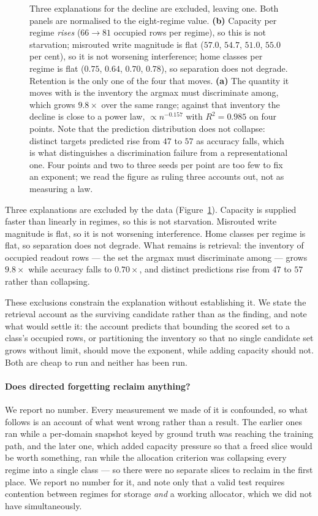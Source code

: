\documentclass[11pt,a4paper]{article}
\begin{document}
\begin{figure}[h]
\begin{subfigure}[t]{0.48\textwidth}
\end{subfigure}
\caption{Three explanations for the decline are excluded, leaving one. Both
panels are normalised to the eight-regime value. \textbf{(b)} Capacity per
regime \emph{rises} ($66\to81$ occupied rows per regime), so this is not
starvation; misrouted write magnitude is flat ($57.0$, $54.7$, $51.0$, $55.0$
per cent), so it is not worsening interference; home classes per regime is flat
($0.75$, $0.64$, $0.70$, $0.78$), so separation does not degrade. Retention is
the only one of the four that moves. \textbf{(a)} The quantity it moves with is
the inventory the argmax must discriminate among, which grows $9.8\times$ over
the same range; against that inventory the decline is close to a power law,
$\propto n^{-0.157}$ with $R^2=0.985$ on four points. Note that the prediction
distribution does not collapse: distinct targets predicted rise from $47$ to
$57$ as accuracy falls, which is what distinguishes a discrimination failure
from a representational one. Four points and two to three seeds per point are
too few to fix an exponent; we read the figure as ruling three accounts out,
not as measuring a law.}
\label{fig:decline}
\end{figure}

Three explanations are excluded by the data (Figure~\ref{fig:decline}).
Capacity is supplied faster than linearly in regimes, so this is not
starvation. Misrouted write magnitude is flat, so it is not worsening
interference. Home classes per regime is flat, so separation does not degrade.
What remains is retrieval: the inventory of occupied readout rows --- the set
the argmax must discriminate among --- grows $9.8\times$ while accuracy falls
to $0.70\times$, and distinct predictions rise from $47$ to $57$ rather than
collapsing.

These exclusions constrain the explanation without establishing it. We state
the retrieval account as the surviving candidate rather than as the finding,
and note what would settle it: the account predicts that bounding the scored
set to a class's occupied rows, or partitioning the inventory so that no single
candidate set grows without limit, should move the exponent, while adding
capacity should not. Both are cheap to run and neither has been run.



\paragraph{Does directed forgetting reclaim anything?}
We report no number. Every measurement we made of it is confounded, so what
follows is an account of what went wrong rather than a result. The earlier ones
ran while a per-domain snapshot keyed by ground truth was reaching the training
path, and the later one, which added capacity pressure so that a freed slice
would be worth something, ran while the allocation criterion was collapsing
every regime into a single class --- so there were no separate slices to
reclaim in the first place. We report no number for it, and note only that a
valid test requires contention between regimes for storage \emph{and} a working
allocator, which we did not have simultaneously.
\end{document}
